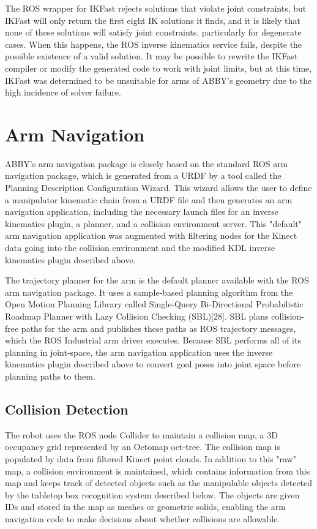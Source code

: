 \documentclass[]{cwru} %
\begin{document}
The ROS wrapper for IKFast rejects solutions that violate joint
constraints, but IKFast will only return the first eight IK solutions it
finds, and it is likely that none of these solutions will satisfy joint
constraints, particularly for degenerate cases. When this happens, the
ROS inverse kinematics service fails, despite the possible existence of
a valid solution. It may be possible to rewrite the IKFast compiler or
modify the generated code to work with joint limits, but at this time,
IKFast was determined to be unsuitable for arms of ABBY's geometry due
to the high incidence of solver failure.

\section{Arm Navigation}
\label{arm-nav}

ABBY's arm navigation package is closely based on the standard ROS arm
navigation package, which is generated from a URDF by a tool called the
Planning Description Configuration Wizard. This wizard allows the user
to define a manipulator kinematic chain from a URDF file and then
generates an arm navigation application, including the necessary launch
files for an inverse kinematics plugin, a planner, and a collision
environment server. This "default" arm navigation application was
augmented with filtering nodes for the Kinect data going into the
collision environment and the modified KDL inverse kinematics plugin
described above.

The trajectory planner for the arm is the default planner available with
the ROS arm navigation package. It uses a sample-based planning
algorithm from the Open Motion Planning Library called Single-Query
Bi-Directional Probabilistic Roadmap Planner with Lazy Collision
Checking (SBL){[}28{]}. SBL plans collision-free paths for the arm and
publishes these paths as ROS trajectory messages, which the ROS
Industrial arm driver executes. Because SBL performs all of its planning
in joint-space, the arm navigation application uses the inverse
kinematics plugin described above to convert goal poses into joint space
before planning paths to them.

\subsection{Collision Detection}

The robot uses the ROS node Collider to maintain a collision map, a 3D
occupancy grid represented by an Octomap oct-tree. The collision map is
populated by data from filtered Kinect point clouds. In addition to this
"raw" map, a collision environment is maintained, which contains
information from this map and keeps track of detected objects such as
the manipulable objects detected by the tabletop box recognition system
described below. The objects are given IDs and stored in the map as
meshes or geometric solids, enabling the arm navigation code to make
decisions about whether collisions are allowable.
\end{document}
